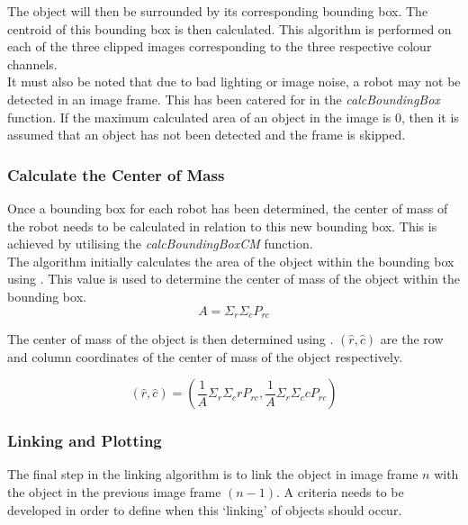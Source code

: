 \documentclass{article}
\begin{document}
The object will then be surrounded by its corresponding bounding box. The centroid of this bounding box is then calculated. This algorithm is performed on each of the three clipped images corresponding to the three respective colour channels.\\

It must also be noted that due to bad lighting or image noise, a robot may not be detected in an image frame. This has been catered for in the \textit{calcBoundingBox} function. If the maximum calculated area of an object in the image is $0$, then it is assumed that an object has not been detected and the frame is skipped.

\subsubsection{Calculate the Center of Mass}
\label{sec:cm}
Once a bounding box for each robot has been determined, the center of mass of the robot needs to be calculated in relation to this new bounding box. This is achieved by utilising the \textit{calcBoundingBoxCM} function.\\

The algorithm initially calculates the area of the object within the bounding box using . This value is used to determine the center of mass of the object within the bounding box.\\

\begin{equation}
A = \Sigma_{r}\Sigma_{c}P_{rc}
\label{eqn:area}
\end{equation}

The center of mass of the object is then determined using . $(\widehat{r}, \widehat{c})$ are the row and column coordinates of the center of mass of the object respectively.

\begin{equation}
(\widehat{r}, \widehat{c}) = (\frac{1}{A}\Sigma_{r}\Sigma_{c}r P_{rc}, \frac{1}{A}\Sigma_{r}\Sigma_{c}c P_{rc})
\label{eqn:cm}
\end{equation}

\subsubsection{Linking and Plotting}
\label{sec:linkplot}
The final step in the linking algorithm is to link the object in image frame $n$ with the object in the previous image frame $(n-1)$. A criteria needs to be developed in order to define when this `linking' of objects should occur. \\
\end{document}
